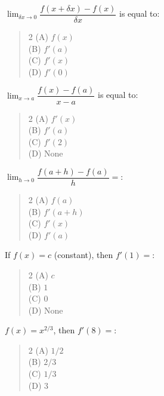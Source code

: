 \documentclass[11pt,a4paper]{article}
\begin{document}
\begin{mcqlist}
\item $\displaystyle\lim_{\delta x\to0}\dfrac{f(x+\delta x)-f(x)}{\delta x}$ is equal to:
\begin{quote}\begin{multicols}{2}
\noindent (A) $f(x)$ \\
(B) $f'(a)$ \\
(C) $f'(x)$ \\
(D) $f'(0)$
\end{multicols}\end{quote}

\item $\displaystyle\lim_{x\to a}\dfrac{f(x)-f(a)}{x-a}$ is equal to:
\begin{quote}\begin{multicols}{2}
\noindent (A) $f'(x)$ \\
(B) $f'(a)$ \\
(C) $f'(2)$ \\
(D) None
\end{multicols}\end{quote}

\item $\displaystyle\lim_{h\to0}\dfrac{f(a+h)-f(a)}{h} = $:
\begin{quote}\begin{multicols}{2}
\noindent (A) $f(a)$ \\
(B) $f'(a+h)$ \\
(C) $f'(x)$ \\
(D) $f'(a)$
\end{multicols}\end{quote}

\item If $f(x)=c$ (constant), then $f'(1)=$:
\begin{quote}\begin{multicols}{2}
\noindent (A) $c$ \\
(B) $1$ \\
(C) $0$ \\
(D) None
\end{multicols}\end{quote}

\item $f(x)=x^{2/3}$, then $f'(8)=$:
\begin{quote}\begin{multicols}{2}
\noindent (A) $1/2$ \\
(B) $2/3$ \\
(C) $1/3$ \\
(D) $3$
\end{multicols}\end{quote}


\end{mcqlist}
\end{document}
